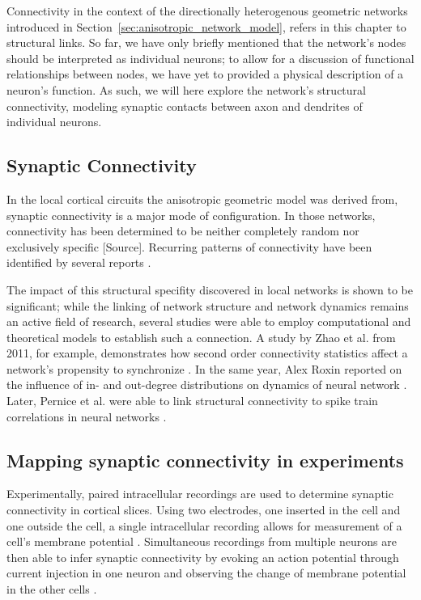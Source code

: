 Connectivity in the context of the directionally heterogenous
geometric networks introduced %
 in Section~\ref{sec:anisotropic_network_model}, refers in this chapter to
structural links. So far, we have only briefly mentioned that the
network's nodes should be interpreted as individual neurons; to allow
for a discussion of functional relationships between nodes, we have yet
to provided a physical description of a neuron's function. As such, we
will here explore the network's structural connectivity, modeling
synaptic contacts between axon and dendrites of individual neurons.


\subsection*{Synaptic Connectivity}

In the local cortical circuits the anisotropic geometric model was
derived from, synaptic connectivity is a major mode of configuration.
In those networks, connectivity has been determined to be neither
completely random nor exclusively specific
[\textcolor{linkgrey}{Source}].%
Recurring patterns of connectivity have been identified by several
reports \parencite{Sporns2004,Song2005,Perin2011}.

The impact of this structural specifity discovered in local networks
is shown to be significant; while the linking of network structure and
network dynamics remains an active field of research, several studies
were able to employ computational and theoretical models to establish
such a connection. A study by Zhao et al. from 2011, for example,
demonstrates how second order connectivity statistics affect a
network's propensity to synchronize
\parencite{Zhao2011}. In the same year, Alex Roxin
reported on the influence of in- and out-degree distributions on
dynamics of neural network \parencite{Roxin2011}. Later,
Pernice et al. were able to link structural connectivity to spike
train correlations in neural networks
\parencite{Pernice2011}.


\subsection*{Mapping synaptic connectivity in experiments}

Experimentally, paired intracellular recordings are used to determine
synaptic connectivity in cortical slices. Using two electrodes, one
inserted in the cell and one outside the cell, a single intracellular
recording allows for measurement of a cell's membrane potential
\parencites[Chapter 3]{Brette_Neural-activity}[]{Scholarpedia-IntracellularRecording}. Simultaneous
recordings from multiple neurons are then able to infer synaptic
connectivity by evoking an action potential through current injection
in one neuron and observing the change of membrane potential in the
other cells \parencite{Song2005}.

